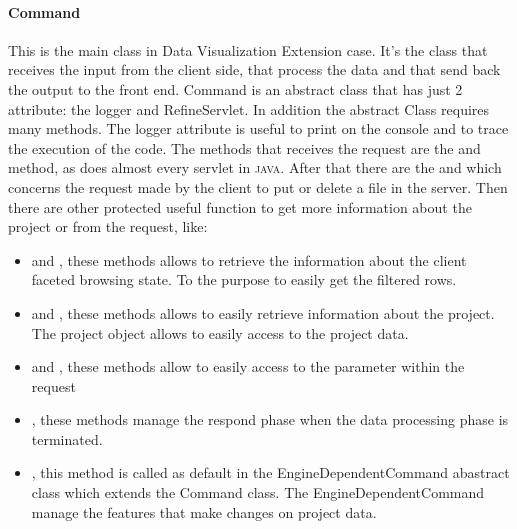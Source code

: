 \paragraph{Command} This is the main class in Data Visualization Extension case. It's the class that receives the input from the client side, that process the data and that send back the output to the front end. Command is an abstract class that has just 2 attribute: the logger and RefineServlet. In addition the abstract Class requires many methods. The logger attribute is useful to print on the console and to trace the execution of the code. The methods that receives the request are the  and  method, as does almost every servlet in \textsc{java}. After that there are the  and  which concerns the request made by the client to put or delete a file in the server. Then there are other protected useful function to get more information about the project or from the request, like:
\begin{itemize}
	\item {} and , these methods allows to retrieve the information about the client faceted browsing state. To the purpose to easily get the filtered rows.
	\item {} and , these methods allows to easily retrieve information about the project. The project object allows to easily access to the project data. 
	\item {} and , these methods allow to easily access to the parameter within the request
	\item {}, these methods manage the respond phase when the data processing phase is terminated. 
	\item {}, this method is called as default in the EngineDependentCommand abastract class which extends the Command class. The EngineDependentCommand manage the features that make changes on project data.
\end{itemize}

